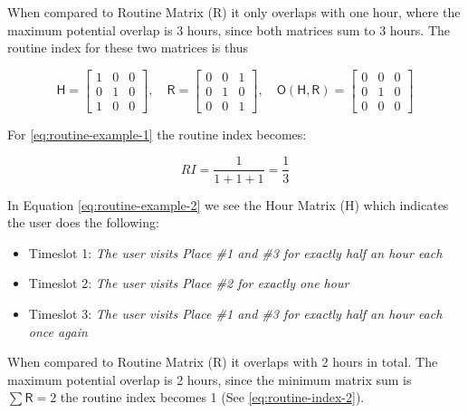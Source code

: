 When compared to Routine Matrix (R) it only overlaps with one hour, where the maximum potential overlap is 3 hours, since both matrices sum to 3 hours. The routine index for these two matrices is thus  \label{eq:routine-index-1} 

\begin{equation}
\label{eq:routine-example-1}
    \mathsf{H} = 
    \begin{bmatrix}
    1 & 0 & 0\\
    0 & 1 & 0\\
    1 & 0 & 0
    \end{bmatrix},\quad
    \mathsf{R} = 
    \begin{bmatrix}
    0 & 0 & 1\\
    0 & 1 & 0\\
    0 & 0 & 1
    \end{bmatrix},\quad
    \mathsf{O}(\mathsf{H}, \mathsf{R}) = 
    \begin{bmatrix}
    0 & 0 & 0\\
    0 & 1 & 0\\
    0 & 0 & 0
    \end{bmatrix}
\end{equation}

For \eqref{eq:routine-example-1} the routine index becomes:

\begin{equation}
    RI = \frac{1}{1 + 1 + 1} = \frac{1}{3}
\end{equation}

In Equation \eqref{eq:routine-example-2} we see the Hour Matrix (H) which indicates the user does the following:

\begin{itemize}
    \item Timeslot 1: \textit{The user visits Place \#1 and \#3 for exactly half an hour each}
    \item Timeslot 2: \textit{The user visits Place \#2 for exactly one hour}
    \item Timeslot 3: \textit{The user visits Place \#1 and \#3 for exactly half an hour each once again}
\end{itemize}

When compared to Routine Matrix (R) it overlaps with 2 hours in total. The maximum potential overlap is 2 hours, since the minimum matrix sum is $\sum \mathsf{R} = 2$ the routine index becomes 1 (See \ref{eq:routine-index-2}).

